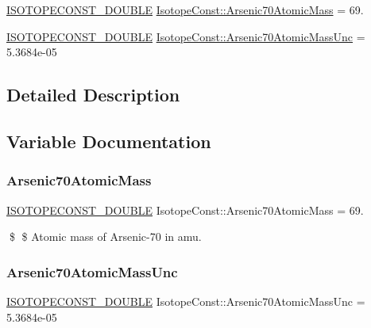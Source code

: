 \begin{DoxyCompactItemize}
\item 
\mbox{\hyperlink{group___isotope_const-_macros_ga8f45a7272ce02c0b4c65c44636ed719a}{I\+S\+O\+T\+O\+P\+E\+C\+O\+N\+S\+T\+\_\+\+D\+O\+U\+B\+LE}} \mbox{\hyperlink{group___isotope_const-_arsenic-_as70_gaa37085ad1775bd360088a017f9ea5a2e}{Isotope\+Const\+::\+Arsenic70\+Atomic\+Mass}} = 69.
\item 
\mbox{\hyperlink{group___isotope_const-_macros_ga8f45a7272ce02c0b4c65c44636ed719a}{I\+S\+O\+T\+O\+P\+E\+C\+O\+N\+S\+T\+\_\+\+D\+O\+U\+B\+LE}} \mbox{\hyperlink{group___isotope_const-_arsenic-_as70_gaed03b0583660826ca0e585033cda143d}{Isotope\+Const\+::\+Arsenic70\+Atomic\+Mass\+Unc}} = 5.\+3684e-\/05
\end{DoxyCompactItemize}


\subsection{Detailed Description}


\subsection{Variable Documentation}
\mbox{\label{group___isotope_const-_arsenic-_as70_gaa37085ad1775bd360088a017f9ea5a2e}} 
\subsubsection{\texorpdfstring{Arsenic70\+Atomic\+Mass}{Arsenic70AtomicMass}}
{\footnotesize\ttfamily \mbox{\hyperlink{group___isotope_const-_macros_ga8f45a7272ce02c0b4c65c44636ed719a}{I\+S\+O\+T\+O\+P\+E\+C\+O\+N\+S\+T\+\_\+\+D\+O\+U\+B\+LE}} Isotope\+Const\+::\+Arsenic70\+Atomic\+Mass = 69.}

\$ \$ Atomic mass of Arsenic-\/70 in amu. \mbox{\label{group___isotope_const-_arsenic-_as70_gaed03b0583660826ca0e585033cda143d}} 
\subsubsection{\texorpdfstring{Arsenic70\+Atomic\+Mass\+Unc}{Arsenic70AtomicMassUnc}}
{\footnotesize\ttfamily \mbox{\hyperlink{group___isotope_const-_macros_ga8f45a7272ce02c0b4c65c44636ed719a}{I\+S\+O\+T\+O\+P\+E\+C\+O\+N\+S\+T\+\_\+\+D\+O\+U\+B\+LE}} Isotope\+Const\+::\+Arsenic70\+Atomic\+Mass\+Unc = 5.\+3684e-\/05}


